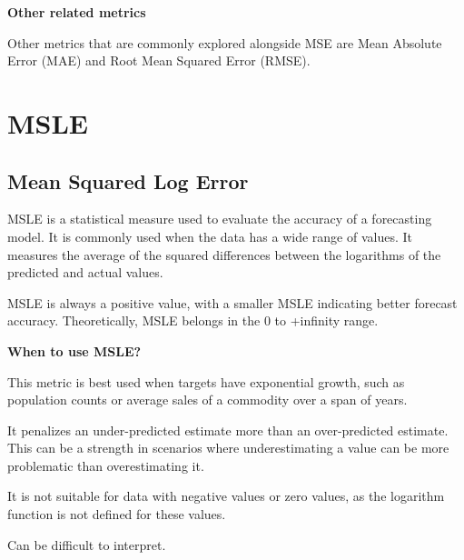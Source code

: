 \textbf{Other related metrics}

Other metrics that are commonly explored alongside MSE are Mean Absolute Error (MAE) and Root Mean Squared Error (RMSE).

\clearpage
\thispagestyle{regressionstyle}
\section{MSLE}
\subsection{Mean Squared Log Error}

MSLE is a statistical measure used to evaluate the accuracy of a forecasting model.
It is commonly used when the data has a wide range of values.
It measures the average of the squared differences between the logarithms of the predicted and actual values.

\begin{center}
\end{center}

MSLE is always a positive value, with a smaller MSLE indicating better forecast accuracy. Theoretically, MSLE belongs in the 0 to +infinity range.

\textbf{When to use MSLE?}

This metric is best used when targets have exponential growth, such as population counts or average sales of a commodity over a span of years.

{
    \item It penalizes an under-predicted estimate more than an over-predicted estimate. This can be a strength in scenarios where underestimating a value can be more problematic than overestimating it.
    \item It is not suitable for data with negative values or zero values, as the logarithm function is not defined for these values.
    \item Can be difficult to interpret. 
}

